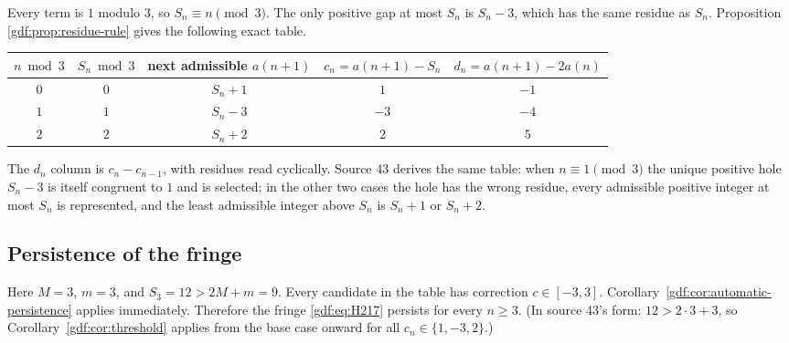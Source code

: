 \documentclass[11pt,a4paper]{article}
\numberwithin{equation}{section}
\theoremstyle{definition}
\theoremstyle{remark}
\theoremstyle{plain}
\begin{document}
Every term is $1$ modulo $3$, so $S_n\equiv n\pmod3$.  The only positive gap
at most $S_n$ is $S_n-3$, which has the same residue as $S_n$.  Proposition
\ref{gdf:prop:residue-rule} gives the following exact table.

\begin{center}
{\small
\begin{tabular}{ccccc}
\toprule
$n\bmod3$ & $S_n\bmod3$ & next admissible $a(n+1)$ & $c_n=a(n+1)-S_n$ &
$d_n=a(n+1)-2a(n)$\\
\midrule
$0$ & $0$ & $S_n+1$ & $1$ & $-1$\\
$1$ & $1$ & $S_n-3$ & $-3$ & $-4$\\
$2$ & $2$ & $S_n+2$ & $2$ & $5$\\
\bottomrule
\end{tabular}
}
\end{center}

The $d_n$ column is $c_n-c_{n-1}$, with residues read cyclically.  Source 43
derives the same table: when $n\equiv1\pmod3$ the unique positive hole
$S_n-3$ is itself congruent to $1$ and is selected; in the other two cases the
hole has the wrong residue, every admissible positive integer at most $S_n$ is
represented, and the least admissible integer above $S_n$ is $S_n+1$ or
$S_n+2$.

\subsection{Persistence of the fringe}

Here $M=3$, $m=3$, and $S_3=12>2M+m=9$.  Every candidate in the table has
correction $c\in[-3,3]$.  Corollary~\ref{gdf:cor:automatic-persistence} applies
immediately.  Therefore the fringe \eqref{gdf:eq:H217} persists for every
$n\ge3$.  (In source 43's form: $12>2\cdot3+3$, so
Corollary~\ref{gdf:cor:threshold} applies from the base case onward for all
$c_n\in\{1,-3,2\}$.)
\end{document}
